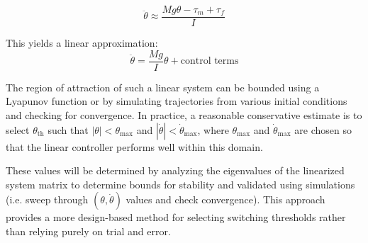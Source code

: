 \documentclass{article}
\begin{document}
\begin{equation*}
\ddot{\theta} \approx \frac{Mg\theta - \tau_m + \tau_f}{I}
\end{equation*}

This yields a linear approximation:
\begin{equation*}
\ddot{\theta} = \frac{Mg}{I}\theta + \text{control terms}
\end{equation*}

The region of attraction of such a linear system can be bounded using a Lyapunov function or by simulating trajectories from various initial conditions and checking for convergence. In practice, a reasonable conservative estimate is to select $\theta_{\text{th}}$ such that $|\theta| < \theta_{\text{max}}$ and $|\dot{\theta}| < \dot{\theta}_{\text{max}}$, where $\theta_{\text{max}}$ and $\dot{\theta}_{\text{max}}$ are chosen so that the linear controller performs well within this domain.

These values will be determined by analyzing the eigenvalues of the linearized system matrix to determine bounds for stability and validated using simulations (i.e. sweep through $(\theta, \dot{\theta})$ values and check convergence). This approach provides a more design-based method for selecting switching thresholds rather than relying purely on trial and error.



\end{document}
